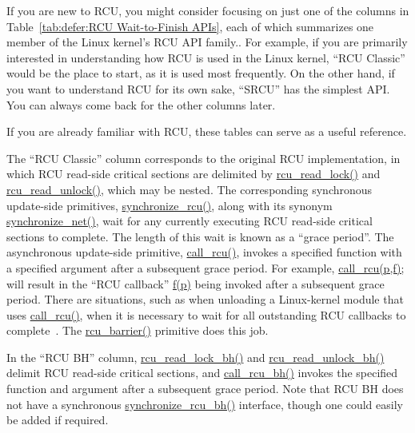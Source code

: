 If you are new to RCU, you might consider focusing on just one
of the columns in
Table~\ref{tab:defer:RCU Wait-to-Finish APIs},
each of which summarizes one member of the Linux kernel's RCU API family..
For example, if you are primarily interested in understanding how RCU
is used in the Linux kernel, ``RCU Classic'' would be the place to start,
as it is used most frequently.
On the other hand, if you want to understand RCU for its own sake,
``SRCU'' has the simplest API.
You can always come back for the other columns later.

If you are already familiar with RCU, these tables can
serve as a useful reference.

\QuickQuizEnd

The ``RCU Classic'' column corresponds to the original RCU implementation,
in which RCU read-side critical sections are delimited by
\url{rcu_read_lock()} and \url{rcu_read_unlock()}, which
may be nested.
The corresponding synchronous update-side primitives,
\url{synchronize_rcu()}, along with its synonym
\url{synchronize_net()}, wait for any currently executing
RCU read-side critical sections to complete.
The length of this wait is known as a ``grace period''.
The asynchronous update-side primitive, \url{call_rcu()},
invokes a specified function with a specified argument after a
subsequent grace period.
For example, \url{call_rcu(p,f);} will result in
the ``RCU callback'' \url{f(p)}
being invoked after a subsequent grace period.
There are situations,
such as when unloading a Linux-kernel module that uses \url{call_rcu()},
when it is necessary to wait for all
outstanding RCU callbacks to complete~\cite{PaulEMcKenney2007rcubarrier}.
The \url{rcu_barrier()} primitive does this job.

In the ``RCU BH'' column, \url{rcu_read_lock_bh()} and
\url{rcu_read_unlock_bh()} delimit RCU read-side critical
sections, and \url{call_rcu_bh()} invokes the specified
function and argument after a subsequent grace period.
Note that RCU BH does not have a synchronous \url{synchronize_rcu_bh()}
interface,
though one could easily be added if required.

